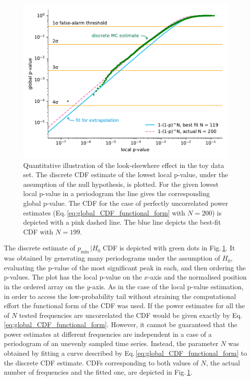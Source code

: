 \begin{figure}
  \centering
  \includegraphics[width=\linewidth]{gfx/axions/MC_estimation_global.pdf}
  \caption{Quantitative illustration of the look-elsewhere effect in the toy data set. The discrete CDF estimate of the lowest local p-value, under the assumption of the null hypothesis, is plotted. For the given lowest local p-value in a periodogram the line gives the corresponding global p-value. The CDF for the case of perfectly uncorrelated power estimates (Eq.\,\ref{eq:global_CDF_functional_form} with $N=200$) is depicted with a pink dashed line. The blue line depicts the best-fit CDF with $N=199$.}\label{fig:P_look-elsewhere}
\end{figure}

The discrete estimate of $p_\text{min} \, | H_0$ CDF is depicted with green dots in Fig.\,\ref{fig:P_look-elsewhere}. It was obtained by generating many periodograms under the assumption of $H_0$, evaluating the p-value of the most significant peak in each, and then ordering the p-values. The plot has the local p-value on the $x$-axis and the normalised position in the ordered array on the $y$-axis.
As in the case of the local p-value estimation, in order to access the low-probability tail without straining the computational effort the functional form of the CDF was used.
If the power estimates for all the of $N$ tested frequencies are uncorrelated the CDF would be given exactly by Eq.\,\ref{eq:global_CDF_functional_form}.
However, it cannot be guaranteed that the power estimates at different frequencies are independent in a case of a periodogram of an unevenly sampled time series.
Instead, the parameter $N$ was obtained by fitting a curve described by Eq.\,\ref{eq:global_CDF_functional_form} to the discrete CDF estimate. CDFs corresponding to both values of $N$, the actual number of frequencies and the fitted one, are depicted in Fig.\,\ref{fig:P_look-elsewhere}.

